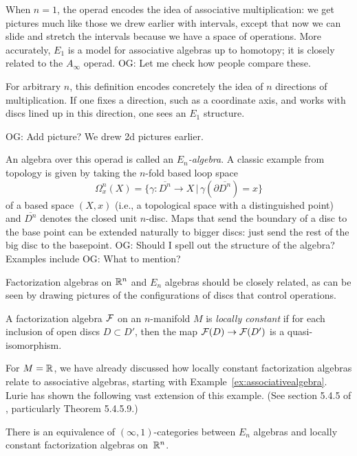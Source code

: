 \documentclass[11pt]{amsart}
\def\mcol{\, | \,}
\def\owen#1{{\textcolor{violet!65!black}{OG: {#1}}}}
\begin{document}
When $n = 1$, the operad encodes the idea of associative multiplication:
we get pictures much like those we drew earlier with intervals, 
except that now we can slide and stretch the intervals because we have a space of operations.
More accurately, $E_1$ is a model for associative algebras up to homotopy; 
it is closely related to the $A_\infty$ operad. \owen{Let me check how people compare these.}

For arbitrary $n$, this definition encodes concretely the idea of $n$ directions of multiplication.
If one fixes a direction, such as a coordinate axis, and works with discs lined up in this direction,
one sees an $E_1$ structure.

\owen{Add picture? We drew 2d pictures earlier.}

An algebra over this operad is called an {\em $E_n$-algebra}.
A classic example from topology is given by taking the $n$-fold based loop space
\[
\Omega^n_x(X) = \{ \gamma: \overline{D^n} \to X \mcol \gamma(\partial \overline{D^n}) = x\}
\]
of a based space $(X,x)$ (i.e., a topological space with a distinguished point) and $\overline{D^n}$ denotes the closed unit $n$-disc.
Maps that send the boundary of a disc to the base point can be extended naturally to bigger discs: just send the rest of the big disc to the basepoint.
\owen{Should I spell out the structure of the algebra?}
Examples include \owen{What to mention?}

Factorization algebras on $\mathbb R^n$ and $E_n$ algebras should be closely related,
as can be seen by drawing pictures of the configurations of discs that control operations.

\begin{dfn}
A factorization algebra $\mathcal F$ on an $n$-manifold $M$ is \emph{locally constant} if for each inclusion of open discs $D \subset D'$, then the map $\mathcal F(D) \to \mathcal F(D')$ is a quasi-isomorphism.
\end{dfn}

For $M = \mathbb R$, we have already discussed how locally constant factorization algebras relate to associative algebras, starting with Example~\ref{ex:associativealgebra}.
Lurie has shown the following vast extension of this example. (See section 5.4.5 of \cite{LurieHA}, particularly Theorem 5.4.5.9.)

\begin{thm}\label{thm:locisen}
There is an equivalence of $(\infty,1)$-categories between $E_n$ algebras and locally constant factorization algebras on~$\mathbb R^n$.  
\end{thm}  
\end{document}
